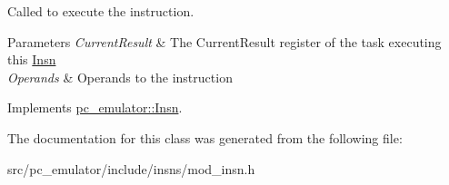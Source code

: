 Called to execute the instruction. 


\begin{DoxyParams}{Parameters}
{\em Current\+Result} & The Current\+Result register of the task executing this \hyperlink{classpc__emulator_1_1Insn}{Insn} \\
\hline
{\em Operands} & Operands to the instruction \\
\hline
\end{DoxyParams}


Implements \hyperlink{classpc__emulator_1_1Insn_a103d27030e872a799e313df16c1f3d66}{pc\+\_\+emulator\+::\+Insn}.



The documentation for this class was generated from the following file\+:\begin{DoxyCompactItemize}
\item 
src/pc\+\_\+emulator/include/insns/mod\+\_\+insn.\+h\end{DoxyCompactItemize}
